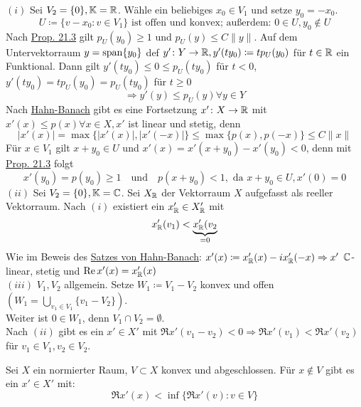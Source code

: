 \begin{beweis}
	$(i)$ Sei $V_{2} = \{ 0 \}, \mathbb{K} = \mathbb{R}$. Wähle ein beliebiges $x_{0} \in V_{1}$ und setze $y_{0} = - x_{0}$. 
	\[ U \coloneqq \{ v - x_{0} : v \in V_{1} \} \text{ ist offen und konvex; außerdem: } 0 \in U, y_{0} \notin U \]
	Nach \hyperref[prop:21.3]{Prop. 21.3} gilt $p_{U}(y_{0}) \geq 1$ und $p_{U}(y) \leq C \| y \|$. Auf dem Untervektorraum $y = \operatorname{span} \{ y_{0} \}$ def $y' \colon Y \rightarrow \mathbb{R}, y'(t y_{0}) \coloneqq t p_{U}(y_{0})$ für $t \in \mathbb{R}$ ein Funktional. Dann gilt $y'(t y_{0}) \leq 0 \leq p_{U}(t y_{0})$ für $t < 0$, $y'(t y_{0}) = t p_{U}(y_{0}) = p_{U}(t y_{0})$ für $t \geq 0$ 
	\[ \Rightarrow y'(y) \leq p_{U}(y) \forall y \in Y \]
	Nach \hyperref[satz:20.3-HahnBanach]{Hahn-Banach} gibt es eine Fortsetzung $x' \colon X \rightarrow \mathbb{R}$ mit $x'(x) \leq p(x) \forall x \in X, x'$ ist linear und stetig, denn 
	\[ |x'(x)| = \max \{ | x'(x) | , | x'(-x) | \} \leq \max \{ p(x) , p(-x) \} \leq C \| x \| \]
	Für $x \in V_{1}$ gilt $x + y_{0} \in U$ und $x'(x) = x'(x + y_{0}) - x'(y_{0}) < 0$, denn mit \hyperref[prop:21.3]{Prop. 21.3} folgt
	\[ x'(y_{0}) = p(y_{0}) \geq 1 \quad \text{und} \quad  p(x + y_{0}) < 1, \text{ da } x + y_{0} \in U, x'(0) = 0 \]
	$(ii)$ Sei $V_{2} = \{ 0 \}, \mathbb{K} = \mathbb{C}$. Sei $X_{\mathbb{R}}$ der Vektorraum $X$ aufgefasst als reeller Vektorraum. Nach $(i)$ existiert ein $x'_{\mathbb{R}} \in X'_{\mathbb{R}}$ mit 
	\[ x'_{\mathbb{R}}(v_{1}) < \underbrace{x'_{\mathbb{R}}(v_{2}}_{= 0}  \]
	Wie im Beweis des \hyperref[satz:20.3-Hahn-Banach]{Satzes von Hahn-Banach}: $x'(x) \coloneqq x'_{\mathbb{R}}(x) - i x'_{\mathbb{R}}(-x) \Rightarrow x'$ $\mathbb{C}$-linear, stetig und $\mathop{\rm Re}\nolimits x'(x) = x'_{\mathbb{R}}(x)$ \\
	$(iii)$ $V_{1}, V_{2}$ allgemein. Setze $W_{1} \coloneqq V_{1} - V_{2}$ konvex und offen $\left( W_{1} = \bigcup_{v_{1} \in V_{1}} \{ v_{1} - V_{2} \} \right)$.  \\
	Weiter ist $0 \in W_{1}$, denn $V_{1} \cap V_{2} = \emptyset$. \\
	Nach $(ii)$ gibt es ein $x' \in X'$ mit $\Re x'(v_{1} - v_{2}) < 0 \Rightarrow \Re x'(v_{1}) < \Re x'(v_{2})$ für $v_{1} \in V_{1}, v_{2} \in V_{2}$.
\end{beweis}

\begin{satz}[2. Trennungssatz]
	Sei $X$ ein normierter Raum, $V \subset X$ konvex und abgeschlossen. Für $x \notin V$ gibt es ein $x' \in X'$ mit:
		\[ \Re x'(x) < \inf \{ \Re x'(v) : v \in V \} \]	
\end{satz}


\newpage
